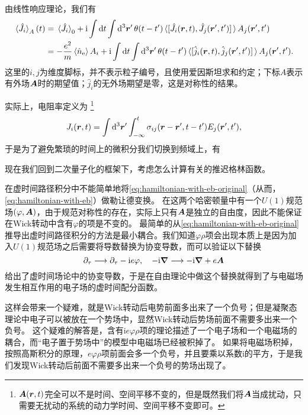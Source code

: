 \documentclass[hyperref, UTF8, a4paper]{ctexart}
\newcommand*{\ii}{\mathrm{i}}
\begin{document}
由线性响应理论，我们有
\[
    \begin{aligned}
        \expval*{\hat{J}_i}_A (t) &= \expval*{\hat{J}_i}_0 + \ii \int \dd{t} \int \dd[3]{\vb*{r}'} \theta(t-t') \expval*{\comm*{\hat{J}_i(\vb*{r}, t)}{\hat{J}_j(\vb*{r}', t')}} A_j(\vb*{r}', t') \\
        &= - \frac{e^2}{m} \expval*{\hat{n}_\text{e}} A_i + \ii \int \dd{t} \int \dd[3]{\vb*{r}'} \theta(t-t') \expval*{\comm*{\hat{j}_i(\vb*{r}, t)}{\hat{j}_j(\vb*{r}', t')}} A_j(\vb*{r}', t').
    \end{aligned}
\]
这里的$i, j$为维度脚标，并不表示粒子编号，且使用爱因斯坦求和约定；下标$A$表示有外场$\vb*{A}$时的期望值；$\hat{j}_i$的无外场期望是零，这是对称性的结果。

实际上，电阻率定义为%
\footnote{$\vb*{A}(\vb*{r}, t)$完全可以不是时间、空间平移不变的，但是既然我们将$\vb*{A}$当成扰动，只需要无扰动的系统的动力学时间、空间平移不变即可。}%
\begin{equation}
    J_i(\vb*{r}, t) = \int \dd[3]{\vb*{r}'} \int_{-\infty}^t \sigma_{ij}(\vb*{r}-\vb*{r}', t - t') E_j(\vb*{r}', t'),
\end{equation}
于是为了避免繁琐的时间上的微积分我们切换到频域上，有

现在我们回到二次量子化的框架下，考虑怎么计算有关的推迟格林函数。

在虚时间路径积分中不能简单地将\eqref{eq:hamiltonian-with-eb-original}（从而，\eqref{eq:hamiltonian-with-eb}）做勒让德变换。
在这两个哈密顿量中有一个$U(1)$规范场$(\varphi, \vb*{A})$，由于规范对称性的存在，实际上只有$\vb*{A}$是独立的自由度，因此不能保证在Wick转动中含有$\varphi$的项是不变的。
最简单的从\eqref{eq:hamiltonian-with-eb-original}推导出虚时间路径积分的方法是最小耦合。我们知道$\varphi \rho$项会出现本质上是因为加入$U(1)$规范场之后需要将导数替换为协变导数，而可以验证以下替换
\begin{equation}
    \partial_\tau \longrightarrow \partial_\tau - \ii e \varphi, \quad - \ii \grad \longrightarrow - \ii \grad + e \vb*{A} 
\end{equation}
给出了虚时间场论中的协变导数，于是在自由理论中做这个替换就得到了与电磁场发生相互作用的电子场的虚时间配分函数。

这样会带来一个疑难，就是Wick转动后电势前面多出来了一个负号；但是凝聚态理论中电子可以被放在一个势场中，显然Wick转动后势场前面不需要多出来一个负号。
这个疑难的解答是，含有$\ii e \varphi \rho$项的理论描述了一个电子场和一个电磁场的耦合，而“电子置于势场中”的模型中电磁场已经被积掉了。
如果将电磁场积掉，按照高斯积分的原理，$e \varphi \rho$项前面会多一个负号，并且要乘以系数$\ii$的平方，于是我们发现Wick转动后前面不需要多出来一个负号的势场出现了。
\end{document}
